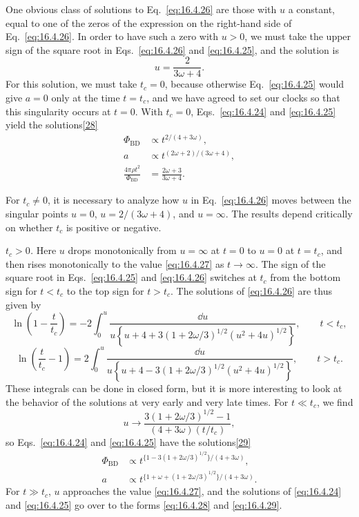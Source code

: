 One obvious class of solutions to Eq.~\eqref{eq:16.4.26} are those with \(u\)
a constant, equal to one of the zeros of the expression on the right-hand side
of Eq.~\eqref{eq:16.4.26}. In order to have such a zero with \(u>0\), we must
take the upper sign of the square root in Eqs.~\eqref{eq:16.4.26} and
\eqref{eq:16.4.25}, and the solution is
\begin{equation}
  u=\frac{2}{3\omega+4}.
  \tag{16.4.27}\label{eq:16.4.27}
\end{equation}
For this solution, we must take \(t_c=0\), because otherwise
Eq.~\eqref{eq:16.4.25} would give \(a=0\) only at the time \(t=t_c\), and
we have agreed to set our clocks so that this singularity occurs at \(t=0\).
With \(t_c=0\), Eqs.~\eqref{eq:16.4.24} and \eqref{eq:16.4.25} yield the
solutions\hyperref[ch16-ref-28]{[28]}
\begin{align}
  \Phi_{\mathrm{BD}}
  &\propto
  t^{2/(4+3\omega)},
  \tag{16.4.28}\label{eq:16.4.28}\\
  a
  &\propto
  t^{(2\omega+2)/(3\omega+4)},
  \tag{16.4.29}\label{eq:16.4.29}\\
  \frac{4\pi\rho t^2}{\Phi_{\mathrm{BD}}}
  &=
  \frac{2\omega+3}{3\omega+4}.
  \tag{16.4.30}\label{eq:16.4.30}
\end{align}

For \(t_c\ne0\), it is necessary to analyze how \(u\) in
Eq.~\eqref{eq:16.4.26} moves between the singular points \(u=0\),
\(u=2/(3\omega+4)\), and \(u=\infty\). The results depend critically on
whether \(t_c\) is positive or negative.

\emph{\(t_c>0\).} Here \(u\) drops monotonically from \(u=\infty\) at \(t=0\)
to \(u=0\) at \(t=t_c\), and then rises monotonically to the value
\eqref{eq:16.4.27} as \(t\to\infty\). The sign of the square root in
Eqs.~\eqref{eq:16.4.25} and \eqref{eq:16.4.26} switches at \(t_c\) from the
bottom sign for \(t<t_c\) to the top sign for \(t>t_c\). The solutions of
\eqref{eq:16.4.26} are thus given by
\[
  \ln\left(1-\frac{t}{t_c}\right)
  =
  -2\int_0^u
  \frac{\dd u}{
    u\left\{
      u+4
      +3(1+2\omega/3)^{1/2}(u^2+4u)^{1/2}
    \right\}
  },
  \qquad t<t_c,
\]
\[
  \ln\left(\frac{t}{t_c}-1\right)
  =
  2\int_0^u
  \frac{\dd u}{
    u\left\{
      u+4
      -3(1+2\omega/3)^{1/2}(u^2+4u)^{1/2}
    \right\}
  },
  \qquad t>t_c.
\]
These integrals can be done in closed form, but it is more interesting to look
at the behavior of the solutions at very early and very late times. For
\(t\ll t_c\), we find
\[
  u\longrightarrow
  \frac{
    3(1+2\omega/3)^{1/2}-1
  }{
    (4+3\omega)(t/t_c)
  },
\]
so Eqs.~\eqref{eq:16.4.24} and \eqref{eq:16.4.25} have the
solutions\hyperref[ch16-ref-29]{[29]}
\begin{align}
  \Phi_{\mathrm{BD}}
  &\propto
  t^{\{1-3(1+2\omega/3)^{1/2}\}/(4+3\omega)},
  \tag{16.4.31}\label{eq:16.4.31}\\
  a
  &\propto
  t^{\{1+\omega+(1+2\omega/3)^{1/2}\}/(4+3\omega)}.
  \tag{16.4.32}\label{eq:16.4.32}
\end{align}
For \(t\gg t_c\), \(u\) approaches the value \eqref{eq:16.4.27}, and the
solutions of \eqref{eq:16.4.24} and \eqref{eq:16.4.25} go over to the forms
\eqref{eq:16.4.28} and \eqref{eq:16.4.29}.


